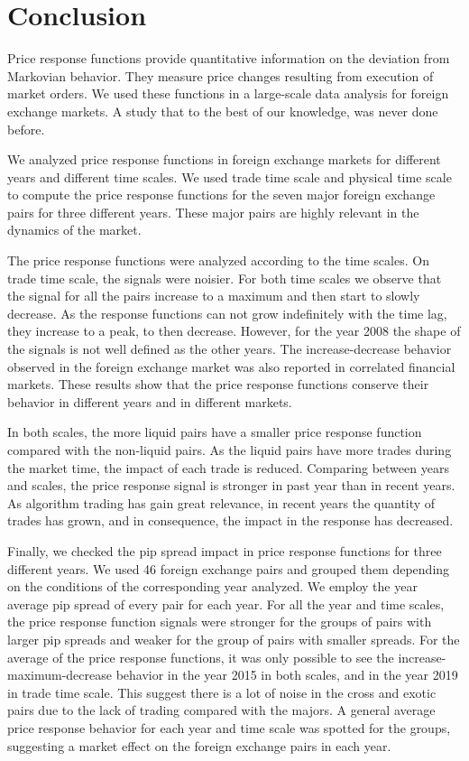 \section{Conclusion}\label{sec:conclusion}

Price response functions provide quantitative information on the deviation
from Markovian behavior. They measure price changes resulting from execution of
market orders. We used these functions in a large-scale data analysis for
foreign exchange markets. A study that to the best of our knowledge, was never
done before.

We analyzed price response functions in foreign exchange markets for different
years and different time scales. We used trade time scale and physical time
scale to compute the price response functions for the seven major foreign
exchange pairs for three different years. These major pairs are highly relevant
in the dynamics of the market.

The price response functions were analyzed according to the time scales. On
trade time scale, the signals were noisier. For both time scales we observe
that the signal for all the pairs increase to a maximum and then start to
slowly decrease. As the response functions can not grow indefinitely with the
time lag, they increase to a peak, to then decrease. However, for the year 2008
the shape of the signals is not well defined as the other years. The
increase-decrease behavior observed in the foreign exchange market was also
reported in correlated financial markets. These results show that the price
response functions conserve their behavior in different years and in different
markets.

In both scales, the more liquid pairs have a smaller price response function
compared with the non-liquid pairs. As the liquid pairs have more trades during
the market time, the impact of each trade is reduced. Comparing between years
and scales, the price response signal is stronger in past year than in recent
years. As algorithm trading has gain great relevance, in recent years the
quantity of trades has grown, and in consequence, the impact in the response
has decreased.

Finally, we checked the pip spread impact in price response functions for three
different years. We used 46 foreign exchange pairs and grouped them depending
on the conditions of the corresponding year analyzed. We employ the year
average pip spread of every pair for each year. For all the year and time
scales, the price response function signals were stronger for the groups of
pairs with larger pip spreads and weaker for the group of pairs with smaller
spreads. For the average of the price response functions, it was only possible
to see the increase-maximum-decrease behavior in the year 2015 in both scales,
and in the year 2019 in trade time scale. This suggest there is a lot of noise
in the cross and exotic pairs due to the lack of trading compared with the
majors. A general average price response behavior for each year and time scale
was spotted for the groups, suggesting a market effect on the foreign exchange
pairs in each year.